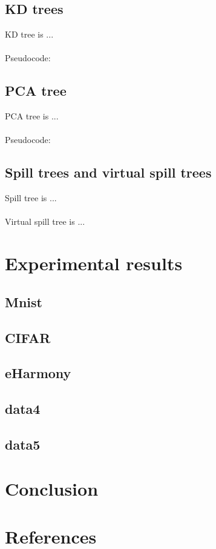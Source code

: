 \documentclass[paper=letter, fontsize=12pt]{article} %
\begin{document}
\subsection{KD trees}
KD tree is ...
\\~\\
Pseudocode:

\subsection{PCA tree}
PCA tree is ...
\\~\\
Pseudocode:

\subsection{Spill trees and virtual spill trees}
Spill tree is ...
\\~\\
Virtual spill tree is ...

\section{Experimental results}
\subsection{Mnist}
\subsection{CIFAR}
\subsection{eHarmony}
\subsection{data4}
\subsection{data5}

\section{Conclusion}

\section{References}
\end{document}
